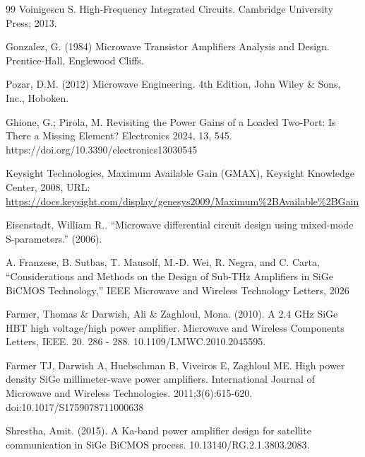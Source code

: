 \begin{thebibliography}{99}
Voinigescu S. High-Frequency Integrated Circuits. Cambridge University Press; 2013.

Gonzalez, G. (1984) Microwave Transistor Amplifiers Analysis and Design. Prentice-Hall, Englewood Cliffs.

Pozar, D.M. (2012) Microwave Engineering. 4th Edition, John Wiley \& Sons, Inc., Hoboken.

Ghione, G.; Pirola, M. Revisiting the Power Gains of a Loaded Two-Port: Is There a Missing Element? Electronics 2024, 13, 545. https://doi.org/10.3390/electronics13030545

Keysight Technologies, Maximum Available Gain (GMAX), Keysight Knowledge Center, 2008, URL: \url{https://docs.keysight.com/display/genesys2009/Maximum%2BAvailable%2BGain}

Eisenstadt, William R.. “Microwave differential circuit design using mixed-mode S-parameters.” (2006).

 A. Franzese, B. Sutbas, T. Mausolf, M.-D. Wei, R. Negra, and C. Carta, “Considerations and Methods on the Design of Sub-THz Amplifiers in SiGe BiCMOS Technology,” IEEE Microwave and Wireless Technology Letters, 2026


Farmer, Thomas \& Darwish, Ali \& Zaghloul, Mona. (2010). A 2.4 GHz SiGe HBT high voltage/high power amplifier. Microwave and Wireless Components Letters, IEEE. 20. 286 - 288. 10.1109/LMWC.2010.2045595.


Farmer TJ, Darwish A, Huebschman B, Viveiros E, Zaghloul ME. High power density SiGe millimeter-wave power amplifiers. International Journal of Microwave and Wireless Technologies. 2011;3(6):615-620. doi:10.1017/S1759078711000638


Shrestha, Amit. (2015). A Ka-band power amplifier design for satellite communication in SiGe BiCMOS process. 10.13140/RG.2.1.3803.2083. 

\end{thebibliography}
